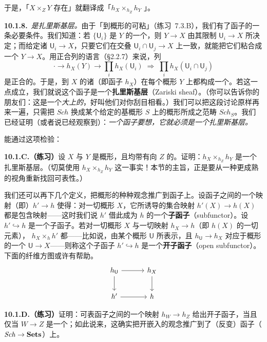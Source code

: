 于是，「$X\times_Z Y$ 存在」就翻译成「$h_X\times_{h_Z}h_Y$ \trRepresentable」。

\textbf{10.1.8.}\ \emph{\trRepresentableFunctor{}是扎里斯基层。}\quad 由于「到概形的\trMorphism{}可粘」（\mbox{练习~7.3.B}），我们有了函子\trRepresentable{}的一条必要条件。我们知道：若 $\{\mathsf{U}_i\}$ 是 $Y$ 的一个\trOpenCover，则\trMorphism{} $Y\to X$ 由其限制 $\mathsf{U}_i\to X$ 所决定；而给定诸\trMorphism{} $\mathsf{U}_i\to X$，只要它们在交叠 $\mathsf{U}_i\cap\mathsf{U}_j\to X$ 上一致，就能把它们粘合成一个\trMorphism{} $Y\to X$。用\trEqualizer{}正合列的语言（\S2.2.7）来说，列
\[
\cdot\longrightarrow h_X(Y)\longrightarrow\prod_i h_X(\mathsf{U}_i)\;\Longrightarrow\;\prod_i h_X(\mathsf{U}_i\cap\mathsf{U}_j)
\]
是正合的。于是，到 $X$ 的诸\trMorphism（即函子 $h_X$）在每个概形 $Y$ 上都构成一个\trSheaf。若这一点成立，我们就说这个函子是一个\textbf{扎里斯基层}（Zariski sheaf）。（你可以告诉你的朋友们：这是一个\emph{大\trZariski\trSite{}上的\trSheaf}，好叫他们对你刮目相看。）我们可以把这段讨论原样再来一遍，只需把 $\mathit{Sch}$ 换成某个给定的基概形 $S$ 上的概形所成之范畴 $\mathit{Sch}_S$。我们已经证明（或者说已经观察到）：\emph{一个函子要想\trRepresentable，它就必须是一个扎里斯基层。}

\trFiberProduct{}能通过这项检验：

\textbf{10.1.C.（练习）}\quad 设 $X$ 与 $Y$ 是概形，且均带有向 $Z$ 的\trMorphism。证明：$h_X\times_{h_Z}h_Y$ 是一个扎里斯基层。（切莫使用 $h_X\times_{h_Z}h_Y$ \trRepresentable{}这一事实！本节的主旨，正是要从一种更成熟的视角重新找回可表性。）

我们还可以再下几个定义，把概形的种种观念推广到函子上。设函子之间的一个映射（即\trNaturalTransformation）$h'\to h$ 使得：对一切概形 $X$，它所诱导的集合映射 $h'(X)\to h(X)$ 都是包含映射——这时我们说 $h'$ 借此成为 $h$ 的一个\textbf{子函子}（subfunctor）。设 $h'\hookrightarrow h$ 是一个子函子。若对一切概形 $X$ 与一切映射 $h_X\to h$（即 $h(X)$ 的一切元素），\trFiberProduct{} $h_X\times_h h'$ 都\trRepresentable——比如说，由某个概形 $\mathsf{U}$ 所表示，且 $h_{\mathsf{U}}\to h_X$ 对应于概形的一个\trOpenEmbedding{} $\mathsf{U}\to X$——则称这个子函子 $h'\hookrightarrow h$ 是一个\textbf{开子函子}（open subfunctor）。下面的纤维方图或许有帮助。
\[
\begin{tikzcd}[row sep=2em, column sep=3.2em]
h_{\mathsf{U}} \ar[r, "\text{\trOpen}"] \ar[d] & h_X \ar[d] \\
h' \ar[r] & h
\end{tikzcd}
\]

\textbf{10.1.D.（练习）}\quad 证明：可表函子之间的一个映射 $h_W\to h_Z$ 给出开子函子，当且仅当 $W\to Z$ 是一个\trOpenEmbedding；如此说来，这确实把开嵌入的观念推广到了（反变）函子（$\mathit{Sch}\to\mathbf{Sets}$）上。

